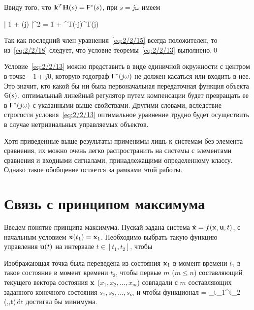 Ввиду того, что $\mathbf{k}^T\mathbf{H}(s) = \mathsf{F}^{*}(s)$, при $s = j\omega$ имеем

    \bigl| 1 + \funcT(j\omega) \bigr|^2 = 1 + ^T(-j\omega)^T\m{\Lambda}(j\omega) 
\eeq

Так как последний член уравнения~\vref{eq:2/2/15} всегда положителен, то из~\ref{eq:2/2/18} следует, что условие теоремы~\ref{eq:2/2/13} выполнено.\qed

Условие~\ref{eq:2/2/13} можно представить в виде единичной окружности с центром в точке $-1 + j0$, которую годограф $\mathsf{F}^{*}(j\omega)$ не должен касаться или входить в нее. Это значит, кто какой бы ни была первоначальная передаточная функция объекта $\mathsf{G}(s)$, оптимальный линейный регулятор путем компенсации будет превращать ее в $\mathsf{F}^{*}(j\omega)$ с указанными выше свойствами. Другими словами, вследствие строгости условия~\vref{eq:2/2/13} оптимальное уравнение трудно будет осуществить в случае нетривиальных управляемых объектов.

\br

Хотя приведенные выше результаты применимы лишь к системам без элемента сравнения, их можно очень легко распространить на системы с элементами сравнения и входными сигналами, принадлежащими определенному классу. Однако такое обобщение остается за рамками этой работы.



\section{Связь с принципом максимума}




Введем понятие принципа максимума. Пускай задана система $\dot{\mathbf{x}} = f(\mathbf{x}, \mathbf{u}, t)$, с начальным условием $\mathbf{x}(t_1) = \mathbf{x}_1$. Необходимо выбрать такую функцию управления $\mathbf{u}(t)$ на интервале $t \in [t_1, t_2]$, чтобы

\benum
    \item
        Изображающая точка была переведена из состояния $\mathbf{x}_1$ в момент времени $t_1$ в такое состояние в момент времени $t_2$, чтобы первые $m$ ($m \leqslant n$) составляющий текущего вектора состояния $\mathbf{x}$ ($x_1, x_2, \ldots, x_m$) совпадали с $m$ составляющих заданного конечного состояния $s_1, s_2, \ldots, s_m$ и чтобы функционал
            \funcF = \int\limits_{t_1}^{t_2} \funcL(,,t)\,dt
        \eeq
        достигал бы минимума.

